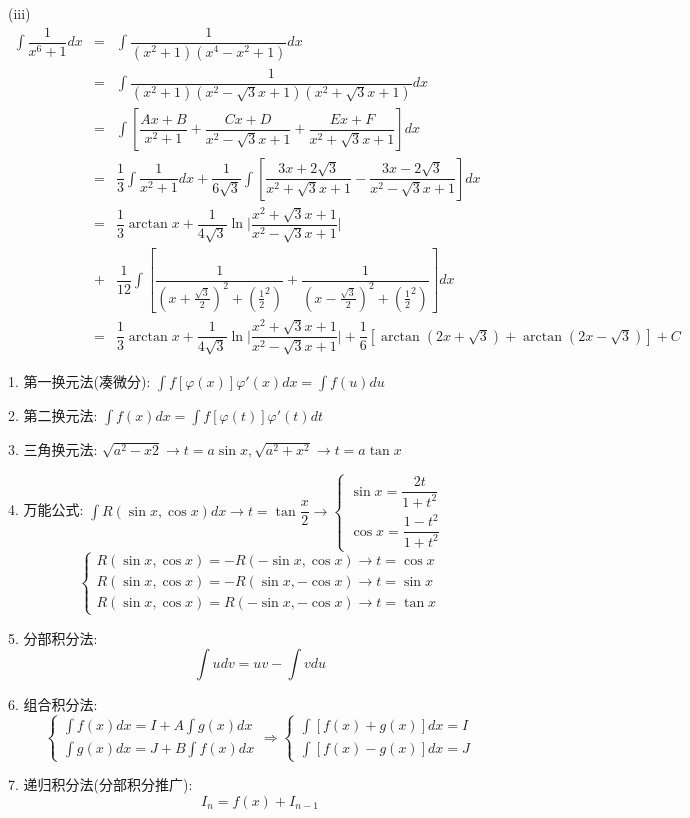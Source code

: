 \begin{corollary}[扩展不定积分]
\begin{solution}
		(iii)
		\begin{eqnarray*}
			\int \dfrac{1}{x^{6}+1} dx & = & \int \dfrac{1}{(x^{2}+1)(x^{4}-x^{2}+1)} dx\\
			                           & = & \int \dfrac{1}{(x^{2}+1)(x^{2}-\sqrt{3}x+1)(x^{2}+\sqrt{3}x+1)} dx\\
			                           & = & \int \left[\dfrac{Ax+B}{x^{2}+1} + \dfrac{Cx+D}{x^{2}-\sqrt{3}x+1} + \dfrac{Ex+F}{x^{2}+\sqrt{3}x+1}\right]dx\\
			                           & = & \dfrac{1}{3}\int \dfrac{1}{x^{2}+1}dx +\dfrac{1}{6\sqrt{3}}\int\left[\dfrac{3x+2\sqrt{3}}{x^{2}+\sqrt{3}x+1} - \dfrac{3x-2\sqrt{3}}{x^{2}-\sqrt{3}x+1}\right]dx\\
			                           & = & \dfrac{1}{3}\arctan x + \dfrac{1}{4\sqrt{3}}\ln \big|\dfrac{x^{2}+\sqrt{3}x+1}{x^{2}-\sqrt{3}x+1}\big|\\ 
									   & + & \dfrac{1}{12}\int \left[\dfrac{1}{(x+\frac{\sqrt{3}}{2})^{2}+(\frac{1}{2}^{2})}+\dfrac{1}{(x-\frac{\sqrt{3}}{2})^{2}+(\frac{1}{2}^{2})}\right]dx\\
			                           & = & \dfrac{1}{3}\arctan x + \dfrac{1}{4\sqrt{3}}\ln \big|\dfrac{x^{2}+\sqrt{3}x+1}{x^{2}-\sqrt{3}x+1}\big| + \dfrac{1}{6}\left[\arctan(2x+\sqrt{3})+\arctan(2x-\sqrt{3})\right]+C
		\end{eqnarray*}
	\end{solution}
\end{corollary}
\begin{definition}[积分方法]
	1. 第一换元法(凑微分): $\int f[\varphi(x)]\varphi'(x)dx = \int f(u)du$

	2. 第二换元法: $\int f(x)dx = \int f[\varphi(t)]\varphi'(t)dt$

	3. 三角换元法: $\sqrt{a^{2}-x{2}}\to t = a\sin x, \sqrt{a^{2}+x^{2}}\to t = a\tan x$

	4. 万能公式: $\int R(\sin x, \cos x)dx \to t = \tan \dfrac{x}{2}\to \begin{cases} \sin x = \dfrac{2t}{1+t^{2}}\\ \cos x = \dfrac{1-t^{2}}{1+t^{2}}\end{cases}$
	$$\begin{cases} 
		R(\sin x,\cos x) = -R(-\sin x,\cos x)\to t =\cos x\\ 
		R(\sin x,\cos x) = -R(\sin x,-\cos x)\to t = \sin x\\
		R(\sin x,\cos x) = R(-\sin x,-\cos x)\to t = \tan x
	\end{cases}$$

	5. 分部积分法:
	$$\int udv = uv - \int vdu$$

	
	6. 组合积分法: 
	$$\begin{cases} 
		\int f(x)dx = I + A\int g(x)dx  \\ 
		\int g(x) dx= J + B\int f(x)dx 
	\end{cases}\Rightarrow
	\begin{cases} 
		\int [f(x) + g(x)]dx = I \\ 
		\int [f(x)-g(x)]dx =J  
	\end{cases}$$

	7. 递归积分法(分部积分推广): 
	$$I_{n} = f(x) + I_{n-1}$$
\end{definition}
